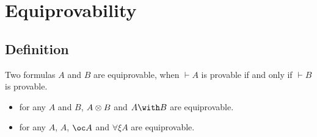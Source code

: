 \section{Equiprovability}\label{equiprovability}

\subsection{Definition}

Two formulas \(A\) and \(B\) are equiprovable, when \(\vdash A\) is
provable if and only if \(\vdash B\) is provable.

\begin{itemize}
\item for any \(A\) and \(B\), \(A\otimes B\) and \(A\with B\) are equiprovable.
\item for any \(A\), \(A\), \(\oc A\) and \(\forall\xi A\) are equiprovable.
\end{itemize}


